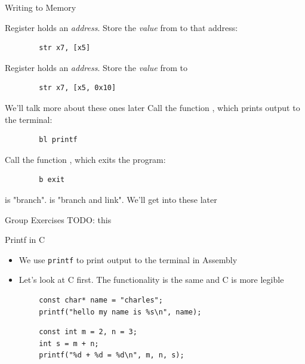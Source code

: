 \begin{frame}[fragile]{Writing to Memory}

	Register  holds an \emph{address}. Store the \emph{value} from  to that address:
	\begin{verbatim}
		str x7, [x5]
	\end{verbatim}

	\vspace{0.5cm}

	Register  holds an \emph{address}. Store the \emph{value} from  to 
	\begin{verbatim}
		str x7, [x5, 0x10]
	\end{verbatim}
\end{frame}

\begin{frame}[fragile]{We'll talk more about these ones later}
	Call the function , which prints output to the terminal:
	\begin{verbatim}
		bl printf
	\end{verbatim}

	\vspace{0.3cm}

	Call the function , which exits the program:
	\begin{verbatim}
		b exit
	\end{verbatim}

	\vspace{0.3cm}
	 is "branch".  is "branch and link". We'll get into these later
\end{frame}

\begin{frame}{Group Exercises}
TODO: this
\end{frame}


\begin{frame}[fragile]{Printf in C}
	\begin{itemize}
		\item We use \texttt{printf} to print output to the terminal in Assembly
		\item Let's look at C first. The functionality is the same and C is more legible
	\end{itemize}

	\begin{verbatim}
		const char* name = "charles";
		printf("hello my name is %s\n", name);
	\end{verbatim}

	\begin{verbatim}
		const int m = 2, n = 3;
		int s = m + n;
		printf("%d + %d = %d\n", m, n, s);
	\end{verbatim}
\end{frame}

